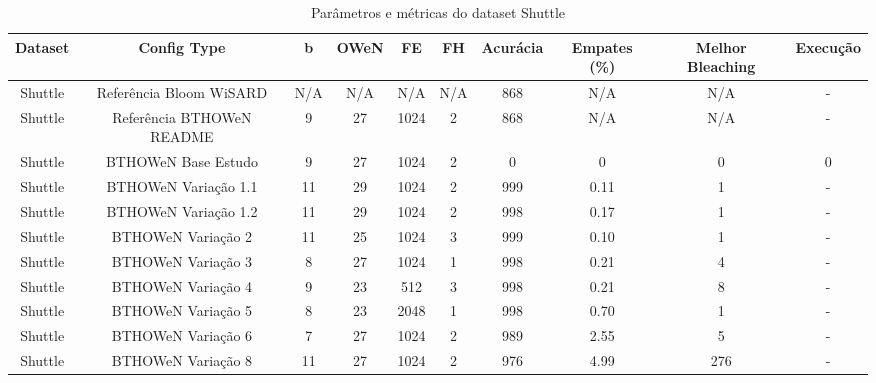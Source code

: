 \documentclass{article}
\begin{document}
\begin{longtable}{|c|c|c|c|c|c|c|c|c|c|}
\caption{Parâmetros e métricas do dataset Shuttle} \\
\hline
\textbf{Dataset} & \textbf{Config Type} & \textbf{b} & \textbf{OWeN} & \textbf{FE} & \textbf{FH} & \textbf{Acurácia} & \textbf{Empates (\%)} & \textbf{Melhor Bleaching} & \textbf{Execução} \\
\hline
Shuttle & Referência Bloom WiSARD & N/A & N/A & N/A & N/A & 868 & N/A & N/A & - \\
\hline
Shuttle & Referência BTHOWeN README & 9 & 27 & 1024 & 2 & 868 & N/A & N/A & - \\
\hline
Shuttle & BTHOWeN Base Estudo & 9 & 27 & 1024 & 2 & 0 & 0 & 0 & 0 \\
\hline
Shuttle & BTHOWeN Variação 1.1 & 11 & 29 & 1024 & 2 & 999 & 0.11 & 1 & - \\
\hline
Shuttle & BTHOWeN Variação 1.2 & 11 & 29 & 1024 & 2 & 998 & 0.17 & 1 & - \\
\hline
Shuttle & BTHOWeN Variação 2 & 11 & 25 & 1024 & 3 & 999 & 0.10 & 1 & - \\
\hline
Shuttle & BTHOWeN Variação 3 & 8 & 27 & 1024 & 1 & 998 & 0.21 & 4 & - \\
\hline
Shuttle & BTHOWeN Variação 4 & 9 & 23 & 512 & 3 & 998 & 0.21 & 8 & - \\
\hline
Shuttle & BTHOWeN Variação 5 & 8 & 23 & 2048 & 1 & 998 & 0.70 & 1 & - \\
\hline
Shuttle & BTHOWeN Variação 6 & 7 & 27 & 1024 & 2 & 989 & 2.55 & 5 & - \\
\hline
Shuttle & BTHOWeN Variação 8 & 11 & 27 & 1024 & 2 & 976 & 4.99 & 276 & - \\
\hline
\end{longtable}
\end{document}
